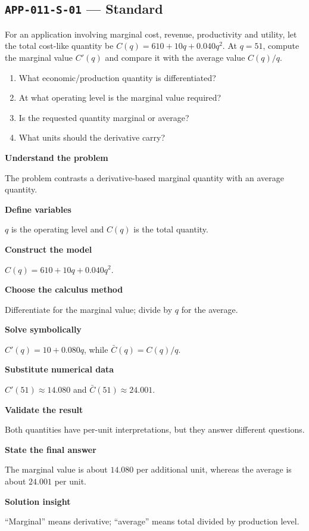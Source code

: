 \documentclass[11pt]{book}
\newcommand{\pid}[1]{\texttt{#1}}
\begin{document}
\subsection*{\pid{APP-011-S-01} — Standard}
\begin{problembox}
For an application involving marginal cost, revenue, productivity and utility, let the total cost-like quantity be $C(q)=610+10q+0.040q^2$. At $q=51$, compute the marginal value $C'(q)$ and compare it with the average value $C(q)/q$.
\end{problembox}
\begin{promptbox}\begin{enumerate}
\item What economic/production quantity is differentiated?
\item At what operating level is the marginal value required?
\item Is the requested quantity marginal or average?
\item What units should the derivative carry?
\end{enumerate}\end{promptbox}
\begin{solutionbox}
\textbf{Understand the problem}\par The problem contrasts a derivative-based marginal quantity with an average quantity.\par\medskip
\textbf{Define variables}\par $q$ is the operating level and $C(q)$ is the total quantity.\par\medskip
\textbf{Construct the model}\par $C(q)=610+10q+0.040q^2$.\par\medskip
\textbf{Choose the calculus method}\par Differentiate for the marginal value; divide by $q$ for the average.\par\medskip
\textbf{Solve symbolically}\par $C'(q)=10+0.080q$, while $\bar C(q)=C(q)/q$.\par\medskip
\textbf{Substitute numerical data}\par $C'(51)\approx 14.080$ and $\bar C(51)\approx 24.001$.\par\medskip
\textbf{Validate the result}\par Both quantities have per-unit interpretations, but they answer different questions.\par\medskip
\textbf{State the final answer}\par The marginal value is about $14.080$ per additional unit, whereas the average is about $24.001$ per unit.\par\medskip
\textbf{Solution insight}\par “Marginal” means derivative; “average” means total divided by production level.\par\medskip
\end{solutionbox}
\end{document}
